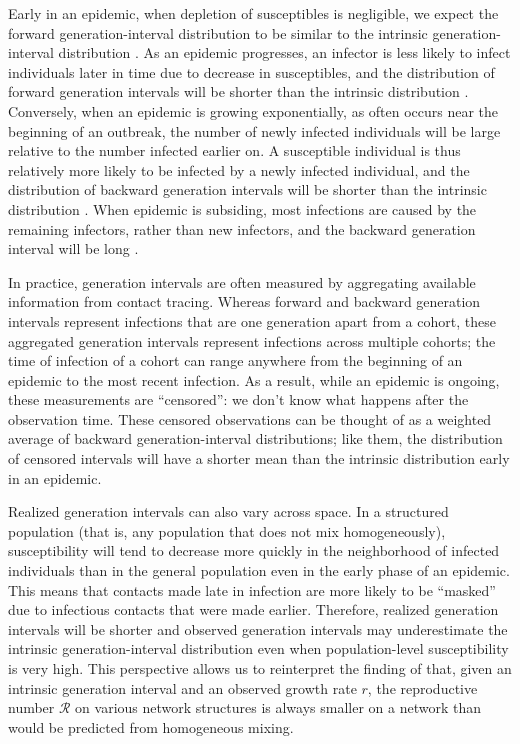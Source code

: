 \documentclass[12pt]{article}
\newcommand{\RR}{\ensuremath{{\mathcal R}}}
\begin{document}
Early in an epidemic, when depletion of susceptibles is negligible, we expect the forward generation-interval distribution to be similar to the intrinsic generation-interval distribution \citep{champredon2015intrinsic}.
As an epidemic progresses, an infector is less likely to infect individuals later in time due to decrease in susceptibles, 
and the distribution of forward generation intervals will be shorter than the intrinsic distribution \citep{kenah2008generation, tomba2010some, champredon2015intrinsic}.
Conversely, when an epidemic is growing exponentially, as often occurs near the beginning of an outbreak, the number of newly infected individuals will be large relative to the number infected earlier on. 
A susceptible individual is thus relatively more likely to be infected by a newly infected individual, 
and the distribution of backward generation intervals will be shorter than the intrinsic distribution \citep{champredon2015intrinsic, britton2019estimation}.
When epidemic is subsiding, most infections are caused by the remaining infectors, rather than new infectors, and the backward generation interval will be long \citep{tomba2010some, champredon2015intrinsic}.

In practice, generation intervals are often measured by aggregating available information from contact tracing. 
Whereas forward and backward generation intervals represent infections that are one generation apart from a cohort, these aggregated generation intervals represent infections across multiple cohorts; 
the time of infection of a cohort can range anywhere from the beginning of an epidemic to the most recent infection.
As a result, while an epidemic is ongoing, these measurements are ``censored'': we don't know what happens after the observation time.
These censored observations can be thought of as a weighted average of backward generation-interval distributions; like them, the distribution of censored intervals will have a shorter mean than the intrinsic distribution early in an epidemic.

Realized generation intervals can also vary across space.
In a structured population (that is, any population that does not mix homogeneously), susceptibility will tend to decrease more quickly in the neighborhood of infected individuals than in the general population even in the early phase of an epidemic. 
This means that contacts made late in infection are more likely to be ``masked'' due to infectious contacts that were made earlier.
Therefore, realized generation intervals will be shorter and observed generation intervals may underestimate the intrinsic generation-interval distribution even when population-level susceptibility is very high.
This perspective allows us to reinterpret the finding of \cite{trapman2016inferring} that, given an intrinsic generation interval and an observed growth rate $r$, the reproductive number $\RR$ on various network structures is always smaller on a network than would be predicted from homogeneous mixing.
\end{document}
